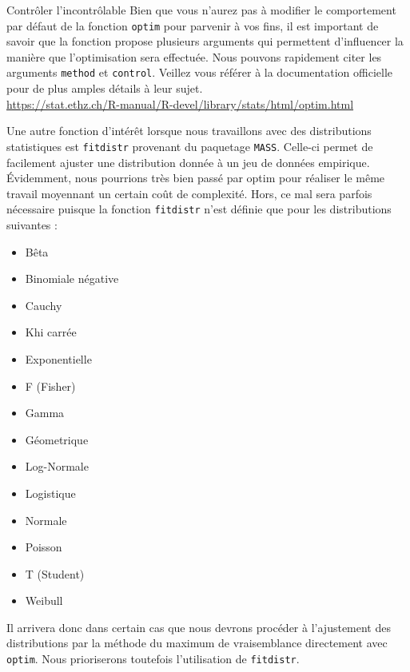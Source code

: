 
\begin{moreInfo}{Contrôler l'incontrôlable}
	Bien que vous n'aurez pas à modifier le comportement par défaut de la fonction \texttt{optim} pour parvenir à vos fins, il est important de savoir que la fonction propose plusieurs arguments qui permettent d'influencer la manière que l'optimisation sera effectuée. Nous pouvons rapidement citer les arguments \texttt{method} et \texttt{control}. Veillez vous référer à la documentation officielle pour de plus amples détails à leur sujet. \\
	\url{https://stat.ethz.ch/R-manual/R-devel/library/stats/html/optim.html}
\end{moreInfo}

Une autre fonction d'intérêt lorsque nous travaillons avec des distributions statistiques est \texttt{fitdistr} provenant du paquetage \texttt{MASS}. Celle-ci permet de facilement ajuster une distribution donnée à un jeu de données empirique. Évidemment, nous pourrions très bien passé par optim pour réaliser le même travail moyennant un certain coût de complexité. Hors, ce mal sera parfois nécessaire puisque la fonction \texttt{fitdistr} n'est définie que pour les distributions suivantes : \cite{MASS}

\begin{multicols}{2}
	\begin{itemize}
		\item Bêta
		\item Binomiale négative
		\item Cauchy
		\item Khi carrée
		\item Exponentielle
		\item F (Fisher)
		\item Gamma
		\columnbreak
		\item Géometrique
		\item Log-Normale
		\item Logistique
		\item Normale
		\item Poisson
		\item T (Student)
		\item Weibull
	\end{itemize}
\end{multicols}

Il arrivera donc dans certain cas que nous devrons procéder à l'ajustement des distributions par la méthode du maximum de vraisemblance directement avec \texttt{optim}. Nous prioriserons toutefois l'utilisation de \texttt{fitdistr}. \\

